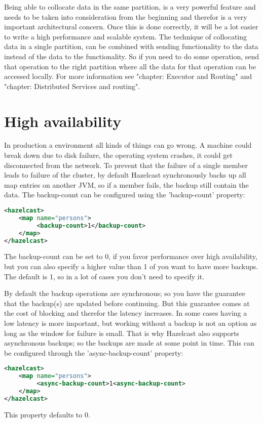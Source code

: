 Being able to collocate data in the same partition, is a very powerful feature and needs to be taken into consideration from the beginning and therefor is a very important architectural concern. Once this is done correctly, it will be a lot easier to write a high performance and scalable system. The technique of collocating data in a single partition, can be combined with sending functionality to the data instead of the data to the functionality. So if you need to do some operation, send that operation to the right partition where all the data for that operation can be accessed locally. For more information see "chapter: Executor and Routing" and "chapter: Distributed Services and routing".

\section{High availability}
In production a environment all kinds of things can go wrong. A machine could break down due to disk failure, the operating system crashes, it could get disconnected from the network. To prevent that the failure of a single member leads to failure of the cluster, by default Hazelcast synchronously backs up all map entries on another JVM, so if a member fails, the backup still contain the data. The backup-count can be configured using the 'backup-count' property:
\begin{lstlisting}[language=xml]
<hazelcast> 
    <map name="persons"> 
         <backup-count>1</backup-count>
    </map> 
</hazelcast>
\end{lstlisting}
The backup-count can be set to 0, if you favor performance over high availability, but you can also specify a higher value than 1 of you want to have more backups. The default is 1, so in a lot of cases you don't need to specify it.

By default the backup operations are synchronous; so you have the guarantee that the backup(s) are updated before continuing. But this guarantee comes at the cost of blocking and therefor the latency increases. In some cases having a low latency is more important, but working without a backup is not an option as long as the window for failure is small. That is why Hazelcast also supports asynchronous backups; so the backups are made at some point in time. This can be configured through the 'async-backup-count' property:
\begin{lstlisting}[language=xml]
<hazelcast> 
    <map name="persons"> 
         <async-backup-count>1<async-backup-count>
    </map> 
</hazelcast>
\end{lstlisting}
This property defaults to 0. 

